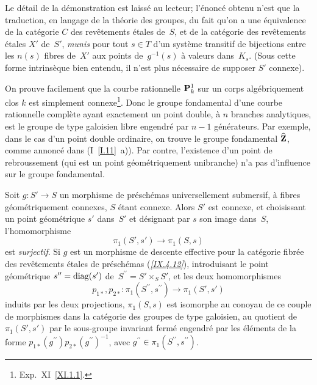 Le
d\'etail de la d\'emonstration est laiss\'e au lecteur;
l'\'enonc\'e obtenu n'est que la traduction, en langage de la
th\'eorie des groupes, du fait qu'on a une \'equivalence de la
cat\'egorie $C$ des rev\^etements \'etales de~$S$, et de la
cat\'egorie des rev\^etements \'etales $X'$ de~$S'$,
\emph{munis} pour tout $s\in T$ d'un syst\`eme transitif de
bijections entre les $n(s)$ fibres de~$X'$ aux points de~$g^{-1}(s)$
\`a valeurs dans~$K_s$. (Sous cette forme intrins\`eque bien
entendu, il n'est plus n\'ecessaire de supposer $S'$ connexe).
\begin{exemple}
\label{IX.5.5}
On prouve facilement que la courbe rationnelle $\mathbf{P}^1_k$ sur un corps
alg\'ebriquement clos $k$ est simplement
connexe\footnote{\Cf Exp.\, XI~\ref{XI.1.1}.}. Donc le groupe
fondamental d'une courbe rationnelle compl\`ete ayant exactement un
point double, \`a $n$ branches analytiques, est le groupe de type
galoisien libre engendr\'e par $n-1$ g\'en\'erateurs. Par
exemple, dans le cas d'un point double ordinaire, on trouve le groupe
fondamental $\widehat{\mathbf{Z}}$, comme annonc\'e dans (I~\ref{I.11}~a)). Par
contre, l'existence d'un point de rebroussement (qui est un point
\og g\'eom\'etriquement unibranche\fg) n'a pas d'influence sur le
groupe fondamental.
\end{exemple}

\begin{corollaire}
\label{IX.5.6}
Soit $g\colon S'\to S$ un morphisme de pr\'esch\'emas
universellement submersif, \`a fibres g\'eom\'etriquement
connexes, $S$ \'etant connexe. Alors $S'$ est connexe, et
choisissant un point g\'eom\'etrique $s'$ dans~$S'$ et
d\'esignant par $s$ son image dans~$S$, l'homomorphisme
$$
\pi_1(S',s')\to \pi_1(S,s)
$$
est \emph{surjectif}. Si $g$ est un morphisme de descente effective
pour la cat\'egorie fibr\'ee des rev\^etements \'etales de
pr\'esch\'emas (\cf \emph{\ref{IX.4.12}}), introduisant le point
g\'eom\'etrique $s^{\prime\prime}=\operatorname{diag}(s')$
de~$S^{\prime\prime}=S'\times_S S'$, et les deux homomorphismes
$$
p_{1*},p_{2*}\colon \pi_1(S^{\prime\prime},s^{\prime\prime}) \to
\pi_1(S',s')
$$
induits par les deux projections, $\pi_1(S, s)$ est isomorphe au
conoyau de ce couple de morphismes dans la cat\'egorie des groupes
de type galoisien, \ie au quotient de~$\pi_1(S',s')$ par le
sous-groupe invariant ferm\'e engendr\'e par les
\'el\'ements de la forme
$p_{1*}(g^{\prime\prime})p_{2*}(g^{\prime\prime})^{-1}$, avec
$g^{\prime\prime}\in \pi_1(S^{\prime\prime},s^{\prime\prime})$.
\end{corollaire}

